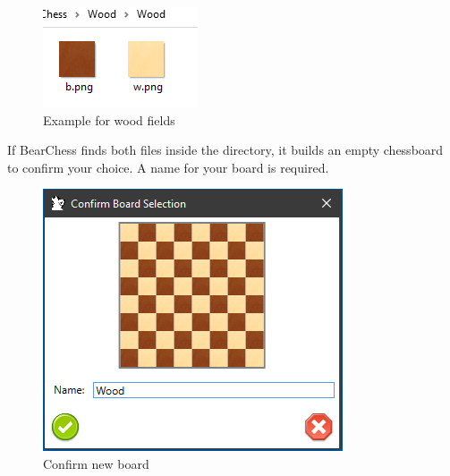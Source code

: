 \documentclass[11pt,a4paper]{article}
\begin{document}
	\begin{figure}[H]
		\centering
		\includegraphics[scale=1.0]{WoodPieces.png}
		\caption{Example for wood fields }
		\label{fig:WoodPieces}
	\end{figure}
	
	If BearChess finds both files inside the directory, it builds an empty chessboard to confirm your choice. A name for your board is required.
	
	\begin{figure}[H]
		\centering
		\includegraphics[scale=1.0]{ConfirmBoard.png}
		\caption{Confirm new board }
		\label{fig:ConfirmBoard}
	\end{figure}
	
\end{document}
